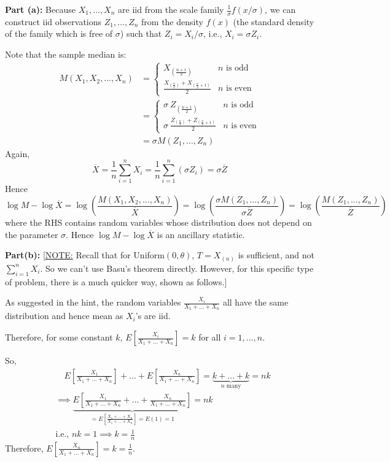 \documentclass[
]{article}
\begin{document}
\textbf{Part (a):} Because \(X_1, \dots, X_n\) are iid from the scale
family \(\frac{1}{\sigma} f(x/\sigma)\), we can construct iid
observations \(Z_1, \dots, Z_n\) from the density \(f(x)\) (the standard
density of the family which is free of \(\sigma\)) such that
\(Z_i = X_i / \sigma\), i.e., \(X_i = \sigma Z_i\).

Note that the sample median is: \[
\begin{aligned}
M(X_1,X_2,\dots,X_n) &= 
\begin{cases}
X_{\left(\frac{n+1}{2}\right)} & n \text{ is odd} \\
\frac{X_{\left(\frac{n}{2}\right)} + X_{\left(\frac{n}{2} + 1\right)}}{2} & n \text{ is even}
\end{cases} \\
&= \begin{cases}
\sigma \ Z_{\left(\frac{n+1}{2}\right)} & n \text{ is odd} \\
\sigma \ \frac{Z_{\left(\frac{n}{2}\right)} + Z_{\left(\frac{n}{2} + 1\right)}}{2} & n \text{ is even}
\end{cases} \\
&= \sigma  M(Z_1, \dots, Z_n)
\end{aligned}
\] Again, \[
\overline X = \frac{1}{n} \sum_{i=1}^n X_i = \frac{1}{n} \sum_{i=1}^n (\sigma  Z_i) = \sigma  \overline{Z}
\] Hence \[
\log M - \log \overline X = \log \left(\frac{M(X_1,X_2,\dots,X_n)}{\overline X} \right) = \log \left(\frac{\sigma  M(Z_1, \dots, Z_n)}{\sigma  \overline Z} \right) = \log \left(\frac{ M(Z_1, \dots, Z_n)}{ \overline Z} \right)
\] where the RHS contains random variables whose distribution does not
depend on the parameter \(\sigma\). Hence \(\log M - \log \overline X\)
is an ancillary statistic.

\textbf{Part(b):} {[}\underline{NOTE:} Recall that for
Uniform\((0, \theta)\), \(T = X_{(n)}\) is sufficient, and not
\(\sum_{i=1}^n X_i\). So we can't use Basu's theorem directly. However,
for this specific type of problem, there is a much quicker way, shown as
follows.{]}

As suggested in the hint, the random variables
\(\displaystyle\frac{X_i}{X_1 + \dots + X_n}\) all have the same
distribution and hence mean as \(X_i\)'s are iid.

Therefore, for some constant \(k\),
\(\displaystyle E\left[\frac{X_i}{X_1 + \dots + X_n}\right] = k\) for
all \(i = 1, \dots, n\).

So, \[
\begin{aligned}
&\quad E\left[\frac{X_1}{X_1 + \dots + X_n}\right] + \dots + E\left[\frac{X_n}{X_1 + \dots + X_n}\right] = \underbrace{k + \dots + k}_{n \text{ many}} = nk \\
&\implies \underbrace{E\left[\frac{X_1}{X_1 + \dots + X_n} + \dots + \frac{X_n}{X_1 + \dots + X_n} \right]}_{= E\left[\frac{X_1 + \dots + X_n}{X_1 + \dots + X_n}\right] = E(1) = 1} = nk \\
&\text{i.e., } nk = 1 \implies k = \frac{1}{n}
\end{aligned}
\] Therefore,
\(\displaystyle E\left[\frac{X_n}{X_1 + \dots + X_n}\right] = k = \frac{1}{n}\).
\end{document}
